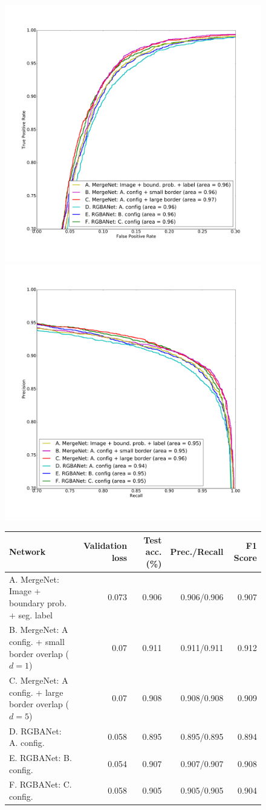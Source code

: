 \begin{figure}[ht]
\begin{floatrow}

\includegraphics[width=.5\textwidth]{gfx/roc_plot.pdf}
\includegraphics[width=.5\textwidth]{gfx/pr_plot.pdf}
\end{floatrow}

\begin{tabular}{l rrrr}
\toprule
Network & Validation loss & Test acc. ~(\%) & Prec./Recall & \hspace{0.1cm} F1 Score \\
\midrule
A. MergeNet: Image + boundary prob. + seg. label & 0.073 & 0.906 & 0.906/0.906 & 0.907 \\
B. MergeNet: A config. + small border overlap ($d=1$) & 0.07 & 0.911 & 0.911/0.911 & 0.912 \\
C. MergeNet: A config. + large border overlap ($d=5$) & 0.07 & 0.908 & 0.908/0.908 & 0.909 \\
D. RGBANet: A. config. & 0.058 & 0.895 & 0.895/0.895 & 0.894 \\
E. RGBANet: B. config. & 0.054 & 0.907 & 0.907/0.907 & 0.908 \\
F. RGBANet: C. config. & 0.058 & 0.905 & 0.905/0.905 & 0.904\\
\bottomrule
\end{tabular}


\end{figure}
